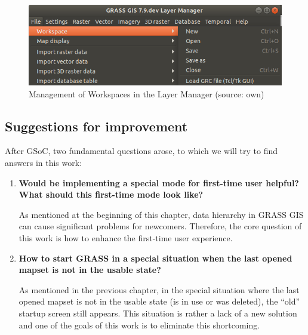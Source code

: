 \documentclass[a4paper,10pt,twoside]{article}
\begin{document}
\vspace{0.3cm}
\begin{figure}[hbt!] 
\begin{center}
\includegraphics[width=13cm]{../pictures/workspace_grass.png} 
\caption[Management of Workspaces in the Layer Manager]{Management of Workspaces in the Layer Manager (source: own)}
\label{fig:workspace_grass}
\end{center}
\end{figure}


\newpage
\vspace*{-1cm}
\subsection{Suggestions for improvement}

After GSoC, two fundamental questions arose, to which we will try to find answers in this work:

\begin{enumerate}

\item  \noindent \textbf{Would be implementing a special mode for first-time user helpful? What should this first-time mode look like?}

\noindent As mentioned at the beginning of this chapter, data hierarchy in GRASS GIS can cause significant problems for newcomers. Therefore, the core question of this work is how to enhance the first-time user experience.

\item \noindent \textbf{How to start GRASS in a special situation when the last opened mapset is not in the usable state?}

As mentioned in the previous chapter, in the special situation where the last opened mapset is not in the usable state (is in use or was deleted), the ``old'' startup screen still appears. This situation is rather a lack of a new solution and one of the goals of this work is to eliminate this shortcoming. 

\end{enumerate}
\end{document}
